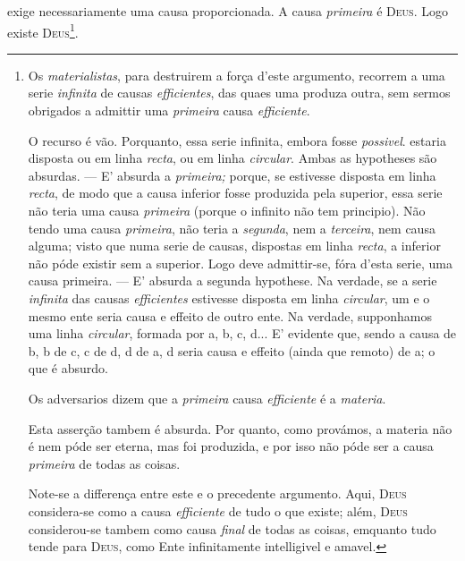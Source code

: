  exige necessariamente uma causa proporcionada. A causa \emph{primeira} é \textsc{Deus}. Logo existe \textsc{Deus}\footnote{Os \emph{materialistas}, para destruirem a força d'este argumento, recorrem a uma serie \emph{infinita} de causas \emph{efficientes}, das quaes uma produza outra, sem sermos obrigados a admittir uma \emph{primeira} causa \emph{efficiente}.\par O recurso é vão. Porquanto, essa serie infinita, embora fosse \emph{possivel}. estaria disposta ou em linha \emph{recta}, ou em linha \emph{circular}. Ambas as hypotheses são absurdas. --- E' absurda a \emph{primeira;} porque, se estivesse disposta em linha \emph{recta}, de modo que a causa inferior fosse produzida pela superior, essa serie não teria uma causa \emph{primeira} (porque o infinito não tem principio). Não tendo uma causa \emph{primeira}, não teria a \emph{segunda}, nem a \emph{terceira}, nem causa alguma; visto que numa serie de causas, dispostas em linha \emph{recta}, a inferior não póde existir sem a superior. Logo deve admittir-se, fóra d'esta serie, uma causa primeira. --- E' absurda a segunda hypothese. Na verdade, se a serie \emph{infinita} das causas \emph{efficientes} estivesse disposta em linha \emph{circular}, um e o mesmo ente seria causa e effeito de outro ente. Na verdade, supponhamos uma linha \emph{circular}, formada por a, b, c, d... E' evidente que, sendo a causa de b, b de c, c de d, d de a, d seria causa e effeito (ainda que remoto) de a; o que é absurdo.\par Os adversarios dizem que a \emph{primeira} causa \emph{efficiente} é a \emph{materia}.\par Esta asserção tambem é absurda. Por quanto, como provámos, a materia não é nem póde ser eterna, mas foi produzida, e por isso não póde ser a causa \emph{primeira} de todas as coisas.\par Note-se a differença entre este e o precedente argumento. Aqui, \textsc{Deus} considera-se como a causa \emph{efficiente} de tudo o que existe; além, \textsc{Deus} considerou-se tambem como causa \emph{final} de todas as coisas, emquanto tudo tende para \textsc{Deus}, como Ente infinitamente intelligivel e amavel.}.

